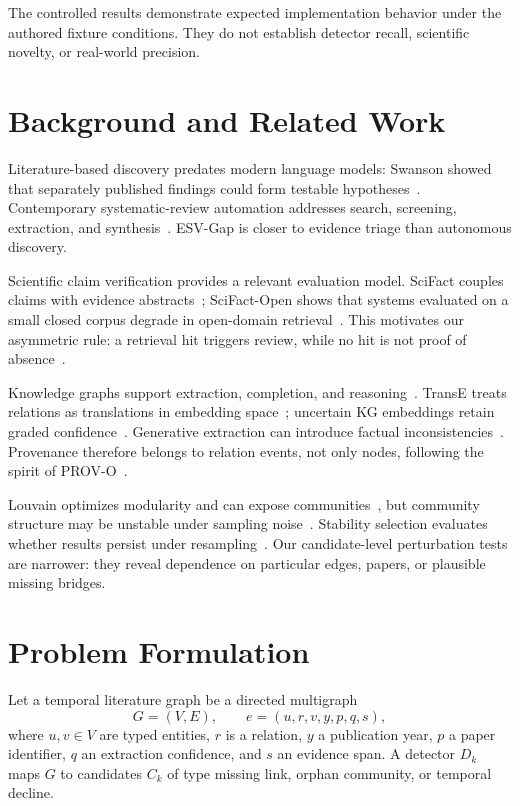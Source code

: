 \documentclass[conference, onecolumn]{IEEEtran}
\begin{document}
The controlled results demonstrate expected implementation behavior under the authored fixture conditions. They do not establish detector recall, scientific novelty, or real-world precision.

\section{Background and Related Work}

Literature-based discovery predates modern language models: Swanson showed that separately published findings could form testable hypotheses~\cite{swanson1986fish}. Contemporary systematic-review automation addresses search, screening, extraction, and synthesis~\cite{marshall2019automation}. ESV-Gap is closer to evidence triage than autonomous discovery.

Scientific claim verification provides a relevant evaluation model. SciFact couples claims with evidence abstracts~\cite{wadden2020scifact}; SciFact-Open shows that systems evaluated on a small closed corpus degrade in open-domain retrieval~\cite{wadden2022scifactopen}. This motivates our asymmetric rule: a retrieval hit triggers review, while no hit is not proof of absence~\cite{altman1995absence}.

Knowledge graphs support extraction, completion, and reasoning~\cite{schneider2022decade}. TransE treats relations as translations in embedding space~\cite{bordes2013transe}; uncertain KG embeddings retain graded confidence~\cite{chen2019ukge}. Generative extraction can introduce factual inconsistencies~\cite{kim2026graphrefine}. Provenance therefore belongs to relation events, not only nodes, following the spirit of PROV-O~\cite{lebo2013provo}.

Louvain optimizes modularity and can expose communities~\cite{blondel2008fast}, but community structure may be unstable under sampling noise~\cite{karrer2008robustness,abbe2018community}. Stability selection evaluates whether results persist under resampling~\cite{meinshausen2010stability}. Our candidate-level perturbation tests are narrower: they reveal dependence on particular edges, papers, or plausible missing bridges.

\section{Problem Formulation}

Let a temporal literature graph be a directed multigraph
\begin{equation}
G=(V,E), \qquad e=(u,r,v,y,p,q,s),
\end{equation}
where $u,v\in V$ are typed entities, $r$ is a relation, $y$ a publication year, $p$ a paper identifier, $q$ an extraction confidence, and $s$ an evidence span. A detector $D_k$ maps $G$ to candidates $C_k$ of type missing link, orphan community, or temporal decline.
\end{document}
